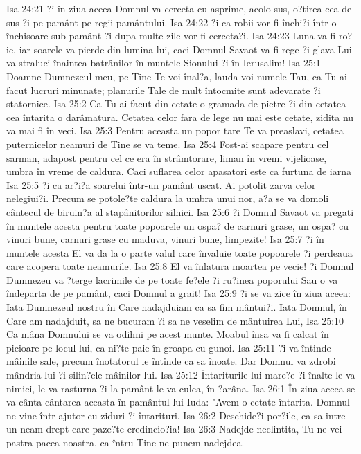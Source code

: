 Isa 24:21  ?i în ziua aceea Domnul va cerceta cu asprime, acolo sus, o?tirea cea de sus ?i pe pamânt pe regii pamântului.
Isa 24:22  ?i ca robii vor fi închi?i într-o închisoare sub pamânt ?i dupa multe zile vor fi cerceta?i.
Isa 24:23  Luna va fi ro?ie, iar soarele va pierde din lumina lui, caci Domnul Savaot va fi rege ?i glava Lui va straluci înaintea batrânilor în muntele Sionului ?i în Ierusalim!
Isa 25:1  Doamne Dumnezeul meu, pe Tine Te voi înal?a, lauda-voi numele Tau, ca Tu ai facut lucruri minunate; planurile Tale de mult întocmite sunt adevarate ?i statornice.
Isa 25:2  Ca Tu ai facut din cetate o gramada de pietre ?i din cetatea cea întarita o darâmatura. Cetatea celor fara de lege nu mai este cetate, zidita nu va mai fi în veci.
Isa 25:3  Pentru aceasta un popor tare Te va preaslavi, cetatea puternicelor neamuri de Tine se va teme.
Isa 25:4  Fost-ai scapare pentru cel sarman, adapost pentru cel ce era în strâmtorare, liman în vremi vijelioase, umbra în vreme de caldura. Caci suflarea celor apasatori este ca furtuna de iarna
Isa 25:5  ?i ca ar?i?a soarelui într-un pamânt uscat. Ai potolit zarva celor nelegiui?i. Precum se potole?te caldura la umbra unui nor, a?a se va domoli cântecul de biruin?a al stapânitorilor silnici.
Isa 25:6  ?i Domnul Savaot va pregati în muntele acesta pentru toate popoarele un ospa? de carnuri grase, un ospa? cu vinuri bune, carnuri grase cu maduva, vinuri bune, limpezite!
Isa 25:7  ?i în muntele acesta El va da la o parte valul care învaluie toate popoarele ?i perdeaua care acopera toate neamurile.
Isa 25:8  El va înlatura moartea pe vecie! ?i Domnul Dumnezeu va ?terge lacrimile de pe toate fe?ele ?i ru?inea poporului Sau o va îndeparta de pe pamânt, caci Domnul a grait!
Isa 25:9  ?i se va zice în ziua aceea: Iata Dumnezeul nostru în Care nadajduiam ca sa fim mântui?i. Iata Domnul, în Care am nadajduit, sa ne bucuram ?i sa ne veselim de mântuirea Lui,
Isa 25:10  Ca mâna Domnului se va odihni pe acest munte. Moabul însa va fi calcat în picioare pe locul lui, ca ni?te paie în groapa cu gunoi.
Isa 25:11  ?i va întinde mâinile sale, precum înotatorul le întinde ca sa înoate. Dar Domnul va zdrobi mândria lui ?i silin?ele mâinilor lui.
Isa 25:12  Întariturile lui mare?e ?i înalte le va nimici, le va rasturna ?i la pamânt le va culca, în ?arâna.
Isa 26:1  În ziua aceea se va cânta cântarea aceasta în pamântul lui Iuda: "Avem o cetate întarita. Domnul ne vine într-ajutor cu ziduri ?i întarituri.
Isa 26:2  Deschide?i por?ile, ca sa intre un neam drept care paze?te credincio?ia!
Isa 26:3  Nadejde neclintita, Tu ne vei pastra pacea noastra, ca întru Tine ne punem nadejdea.
